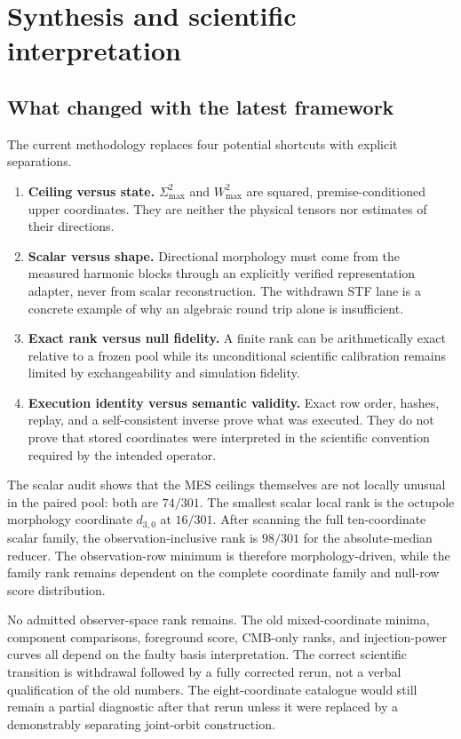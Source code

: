 \documentclass[11pt,a4paper]{article}
\begin{document}
\section{Synthesis and scientific interpretation}

\subsection{What changed with the latest framework}

The current methodology replaces four potential shortcuts with explicit
separations.
\begin{enumerate}[leftmargin=*]
  \item \textbf{Ceiling versus state.}  $\Sigma^2_{\max}$ and $W^2_{\max}$
  are squared, premise-conditioned upper coordinates.  They are neither the
  physical tensors nor estimates of their directions.
  \item \textbf{Scalar versus shape.}  Directional morphology must come from
  the measured harmonic blocks through an explicitly verified representation
  adapter, never from scalar reconstruction.  The withdrawn STF lane is a
  concrete example of why an algebraic round trip alone is insufficient.
  \item \textbf{Exact rank versus null fidelity.}  A finite rank can be
  arithmetically exact relative to a frozen pool while its unconditional
  scientific calibration remains limited by exchangeability and simulation
  fidelity.
  \item \textbf{Execution identity versus semantic validity.}  Exact row
  order, hashes, replay, and a self-consistent inverse prove what was executed.
  They do not prove that stored coordinates were interpreted in the scientific
  convention required by the intended operator.
\end{enumerate}

The scalar audit shows that the MES ceilings themselves are not locally
unusual in the paired pool: both are $74/301$.  The smallest scalar local rank
is the octupole morphology coordinate $d_{3,0}$ at $16/301$.  After scanning
the full ten-coordinate scalar family, the observation-inclusive rank is
$98/301$ for the absolute-median reducer.  The observation-row minimum is
therefore morphology-driven, while the family rank remains dependent on the
complete coordinate family and null-row score distribution.

No admitted observer-space rank remains.  The old mixed-coordinate minima,
component comparisons, foreground score, CMB-only ranks, and injection-power
curves all depend on the faulty basis interpretation.  The correct scientific
transition is withdrawal followed by a fully corrected rerun, not a verbal
qualification of the old numbers.  The eight-coordinate catalogue would still
remain a partial diagnostic after that rerun unless it were replaced by a
demonstrably separating joint-orbit construction.
\end{document}
